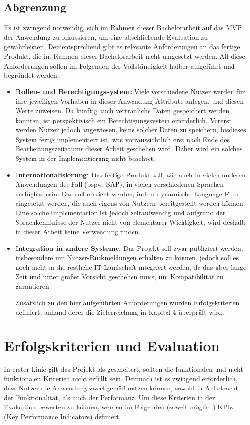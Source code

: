 \subsection{Abgrenzung}
Es ist zwingend notwendig, sich im Rahmen dieser Bachelorarbeit auf das MVP der Anwendung zu fokussieren, um eine abschließende
Evaluation zu gewährleisten. Dementsprechend gibt es relevante Anforderungen an das fertige Produkt, die im Rahmen dieser Bachelorarbeit 
nicht umgesetzt werden. All diese Anforderungen sollen im Folgenden der Vollständigkeit halber aufgeführt und begründet werden.\break
\begin{itemize}
  \item \textbf{Rollen- und Berechtigungssystem:} 
Viele verschiedene Nutzer werden für ihre jeweiligen Vorhaben in dieser Anwendung Attribute anlegen, und diesen Werte zuweisen. Da künftig auch vertrauliche Daten gespeichert 
werden könnten, ist perspektivisch ein Berechtigungssystem erforderlich. Vorerst werden Nutzer jedoch angewiesen, keine solcher Daten zu speichern, bisdieses System fertig 
implementiert ist, was vorraussichtlich erst nach Ende des Bearbeitungszeitraums dieser Arbeit geschehen wird. Daher wird ein solches System in der Implementierung nicht beachtet.

\item \textbf{Internationalisierung:} 
Das fertige Produkt soll, wie auch in vielen anderen Anwendungen der Fall (bspw. SAP), in vielen verschiedenen Sprachen verfügbar sein. 
Das soll erreicht werden, indem dynamische Language Files eingesetzt werden, die auch eigens von Nutzern bereitgestellt werden können. Eine solche Implementation 
ist jedoch zeitaufwendig und aufgrund der Sprachkenntnisse der Nutzer nicht von elementarer Wichtigkeit, wird deshalb in dieser Arbeit keine Verwendung finden.\break
\item \textbf{Integration in andere Systeme:} 
Das Projekt soll zwar publiziert werden, insbesondere um Nutzer-Rückmeldungen erhalten zu können, jedoch soll es noch nicht in die restliche IT-Landschaft integriert werden,
da das über lange Zeit und unter großer Vorsicht geschehen muss, um Kompatibilität zu garantieren.

Zusätzlich zu den hier aufgeführten Anforderungen wurden Erfolgskriterien definiert, anhand derer die Zielerreichung in Kapitel 4 überprüft wird.
\end{itemize}
\section{Erfolgskriterien und Evaluation}
In erster Linie gilt das Projekt als gescheitert, sollten die funktionalen und nicht-funktionalen Kriterien nicht erfüllt sein. 
Demnach ist es zwingend erforderlich, dass Nutzer die Anwendung zweckgemäß nutzen können, sowohl in Anbetracht der Funktionalität, als auch 
der Performanz. Um diese Kriterien in der Evaluation bewerten zu können, werden im Folgenden (soweit möglich) KPIs (Key Performance Indicators) definiert.
